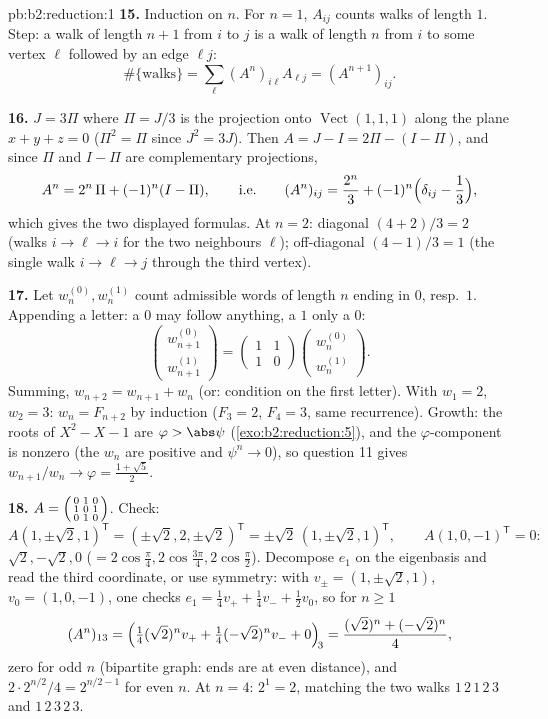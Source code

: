 \begin{solution}{pb:b2:reduction:1}
\textbf{15.} Induction on $n$. For $n = 1$, $A_{ij}$ counts
walks of length $1$. Step: a walk of length $n + 1$ from $i$ to
$j$ is a walk of length $n$ from $i$ to some vertex $\ell$
followed by an edge $\ell j$:
\[
\#\{\text{walks}\} = \sum_{\ell} (A^n)_{i\ell}A_{\ell j} =
(A^{n+1})_{ij}.
\]

\textbf{16.} $J = 3\Pi$ where $\Pi = J/3$ is the projection onto
$\operatorname{Vect}(1,1,1)$ along the plane $x + y + z = 0$
($\Pi^2 = \Pi$ since $J^2 = 3J$). Then $A = J - I = 2\Pi - (I -
\Pi)$, and since $\Pi$ and $I - \Pi$ are complementary
projections,
\[
A^n = 2^n\,\Pi + (-1)^n (I - \Pi),
\qquad\text{i.e.}\qquad
(A^n)_{ij} = \frac{2^n}3 + (-1)^n\Bigl(\delta_{ij} -
\frac13\Bigr),
\]
which gives the two displayed formulas. At $n = 2$: diagonal
$(4 + 2)/3 = 2$ (walks $i \to \ell \to i$ for the two neighbours
$\ell$); off-diagonal $(4 - 1)/3 = 1$ (the single walk $i \to
\ell \to j$ through the third vertex).

\textbf{17.} Let $w_n^{(0)}, w_n^{(1)}$ count admissible words of
length $n$ ending in $0$, resp.\ $1$. Appending a letter: a $0$
may follow anything, a $1$ only a $0$:
\[
\begin{pmatrix} w_{n+1}^{(0)}\\ w_{n+1}^{(1)}\end{pmatrix}
= \begin{pmatrix} 1 & 1\\ 1 & 0\end{pmatrix}
\begin{pmatrix} w_n^{(0)}\\ w_n^{(1)}\end{pmatrix}.
\]
Summing, $w_{n+2} = w_{n+1} + w_n$ (or: condition on the first
letter). With $w_1 = 2$, $w_2 = 3$: $w_n = F_{n+2}$ by induction
($F_3 = 2$, $F_4 = 3$, same recurrence). Growth: the roots of
$X^2 - X - 1$ are $\varphi > \abs\psi$
(\cref{exo:b2:reduction:5}), and the $\varphi$-component is
nonzero (the $w_n$ are positive and $\psi^n \to 0$), so question
11 gives $w_{n+1}/w_n \to \varphi = \frac{1 + \sqrt5}2$.

\textbf{18.} $A = \begin{psmallmatrix} 0&1&0\\ 1&0&1\\
0&1&0\end{psmallmatrix}$. Check:
\[
A(1, \pm\sqrt2, 1)^{\mathsf T}
= (\pm\sqrt2, 2, \pm\sqrt2)^{\mathsf T}
= \pm\sqrt2\,(1, \pm\sqrt2, 1)^{\mathsf T},
\qquad
A(1, 0, -1)^{\mathsf T} = 0 :
\]
 $\sqrt2, -\sqrt2, 0$ ($= 2\cos\frac\pi4,
2\cos\frac{3\pi}4, 2\cos\frac\pi2$). Decompose $e_1$ on the
eigenbasis and read the third coordinate, or use symmetry: with
$v_\pm = (1, \pm\sqrt2, 1)$, $v_0 = (1, 0, -1)$, one checks $e_1
= \frac14 v_+ + \frac14 v_- + \frac12 v_0$, so for $n \geq 1$
\[
(A^n)_{13} = \Bigl(\tfrac14(\sqrt2)^n v_+ +
\tfrac14(-\sqrt2)^n v_- + 0\Bigr)_{\!3}
= \frac{(\sqrt2)^n + (-\sqrt2)^n}{4},
\]
zero for odd $n$ (bipartite graph: ends are at even distance),
and $2\cdot 2^{n/2}/4 = 2^{n/2 - 1}$ for even $n$. At $n = 4$:
$2^{1} = 2$, matching the two walks $1\,2\,1\,2\,3$ and
$1\,2\,3\,2\,3$.


\end{solution}
